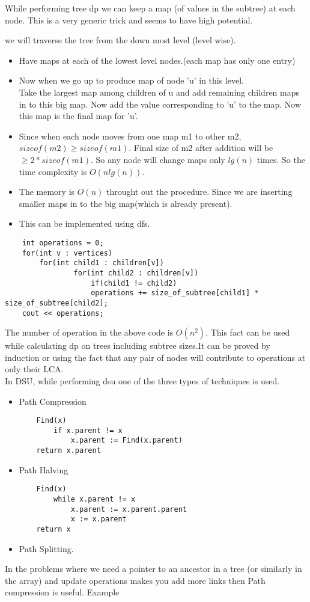 \documentclass[../Notes.tex]{subfiles}
\begin{document}
While performing tree dp we can keep a map (of values in the subtree) at each node. This is a very generic trick and seems to have high potential.

we will traverse the tree from the down most level (level wise).

\begin{itemize}
	\item Have maps at each of the lowest level nodes.(each map has only one entry)
	\item Now when we go up to produce map of node 'u' in this level.\\
	Take the largest map among children of u and add remaining children maps in to this big map. Now add the value corresponding to 'u' to the map. Now this map is the final map for 'u'.
	\item Since when each node moves from one map m1 to other m2, $sizeof(m2) \geq sizeof(m1)$. Final size of m2 after addition will be $\geq 2*sizeof(m1)$. So any node will change maps only $lg(n)$ times. So the time complexity is $O(nlg(n))$.
	\item The memory is $O(n)$ throught out the procedure. Since we are inserting smaller maps in to the big map(which is already present).
	\item This can be implemented using dfs.
\end{itemize}

\begin{lstlisting}
	int operations = 0;
	for(int v : vertices)
  		for(int child1 : children[v])
    			for(int child2 : children[v])
    				if(child1 != child2)
      				operations += size_of_subtree[child1] * size_of_subtree[child2];
	cout << operations;
\end{lstlisting}
The number of operation in the above code is $O(n^2)$. This fact can be used while calculating dp on trees including subtree sizes.It can be proved by induction or using the fact that any pair of nodes will contribute to operations at only their LCA.\\


In DSU, while performing dsu one of the three types of techniques is used.
\begin{itemize}
	\item Path Compression \\
	\begin{lstlisting}
	Find(x)
    	if x.parent != x
     		x.parent := Find(x.parent)
	return x.parent
   	\end{lstlisting}
   	
   	\item Path Halving \\
   	\begin{lstlisting}
   	Find(x)
   		while x.parent != x
     		x.parent := x.parent.parent
     		x := x.parent
   	return x
   \end{lstlisting}
   
   \item Path Splitting.
\end{itemize}
In the problems where we need a pointer to an ancestor in a tree (or similarly in the array) and update operations makes you add more links then Path compression is useful. Example \\
\end{document}
